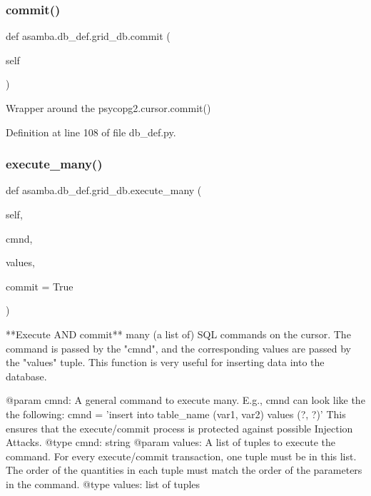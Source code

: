 \subsubsection{\texorpdfstring{commit()}{commit()}}
{\footnotesize\ttfamily def asamba.\+db\+\_\+def.\+grid\+\_\+db.\+commit (\begin{DoxyParamCaption}\item[{}]{self }\end{DoxyParamCaption})}

\begin{DoxyVerb}Wrapper around the psycopg2.cursor.commit()
\end{DoxyVerb}
 

Definition at line 108 of file db\+\_\+def.\+py.

\mbox{\label{classasamba_1_1db__def_1_1grid__db_af8c4c50b39e4fb32a27e4f696240d806}} 
\subsubsection{\texorpdfstring{execute\+\_\+many()}{execute\_many()}}
{\footnotesize\ttfamily def asamba.\+db\+\_\+def.\+grid\+\_\+db.\+execute\+\_\+many (\begin{DoxyParamCaption}\item[{}]{self,  }\item[{}]{cmnd,  }\item[{}]{values,  }\item[{}]{commit = {\ttfamily True} }\end{DoxyParamCaption})}

\begin{DoxyVerb}**Execute AND commit** many (a list of) SQL commands on the cursor.
The command is passed by the "cmnd", and the corresponding values are passed
by the "values" tuple. This function is very useful for inserting data into
the database.

@param cmnd: A general command to execute many. E.g., cmnd can look like the 
   the following: cmnd = 'insert into table_name (var1, var2) values (?, ?)'
   This ensures that the execute/commit process is protected against possible
   Injection Attacks. 
@type cmnd: string
@param values: A list of tuples to execute the command. For every execute/commit
  transaction, one tuple must be in this list. The order of the quantities 
  in each tuple must match the order of the parameters in the command.
@type values: list of tuples
\end{DoxyVerb}
 


